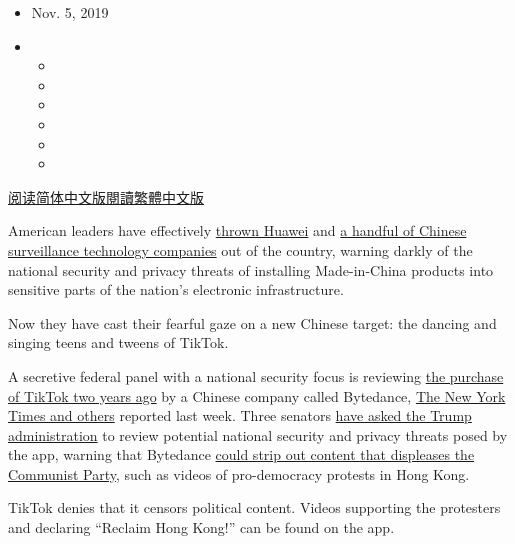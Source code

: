 \begin{itemize}
\item
  Nov. 5, 2019
\item
  \begin{itemize}
  \item
  \item
  \item
  \item
  \item
  \item
  \end{itemize}
\end{itemize}

\href{https://cn.nytimes.com/business/20191105/tiktok-china-bytedance/}{阅读简体中文版}\href{https://cn.nytimes.com/business/20191105/tiktok-china-bytedance/zh-hant/}{閱讀繁體中文版}

American leaders have effectively
\href{https://www.nytimes.com/2019/08/07/business/huawei-us-ban.html}{thrown
Huawei} and
\href{https://www.nytimes.com/2019/10/08/business/china-human-rights-technology-xinjiang.html}{a
handful of Chinese surveillance technology companies} out of the
country, warning darkly of the national security and privacy threats of
installing Made-in-China products into sensitive parts of the nation's
electronic infrastructure.

Now they have cast their fearful gaze on a new Chinese target: the
dancing and singing teens and tweens of TikTok.

A secretive federal panel with a national security focus is reviewing
\href{https://www.nytimes.com/2017/11/10/business/dealbook/musically-sold-app-video.html}{the
purchase of TikTok two years ago} by a Chinese company called Bytedance,
\href{https://www.nytimes.com/2019/11/01/technology/tiktok-national-security-review.html}{The
New York Times and others} reported last week. Three senators
\href{https://www.cotton.senate.gov/?p=press_release\&id=1239}{have
asked the Trump administration} to review potential national security
and privacy threats posed by the app, warning that Bytedance
\href{https://www.rubio.senate.gov/public/index.cfm/2019/10/rubio-requests-cfius-review-of-tiktok-following-reports-of-chinese-censorship}{could
strip out content that displeases the Communist Party}, such as videos
of pro-democracy protests in Hong Kong.

TikTok denies that it censors political content. Videos supporting the
protesters and declaring ``Reclaim Hong Kong!'' can be found on the app.

